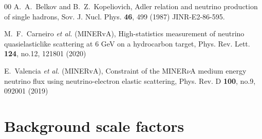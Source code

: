 \documentclass[aps,prl,twocolumn,superscriptaddress,nofootinbib]{revtex4-1}
\begin{document}
\begin{thebibliography}{00}
A.~A.~Belkov and B.~Z.~Kopeliovich,
Adler relation and neutrino production of single hadrons,
Sov. J. Nucl. Phys. \textbf{46}, 499 (1987)
JINR-E2-86-595.

M.~F.~Carneiro \textit{et al.} (MINERvA),
High-statistics measurement of neutrino quasielasticlike scattering at 6 GeV on a hydrocarbon target,
Phys. Rev. Lett. \textbf{124}, no.12, 121801 (2020)

E.~Valencia \textit{et al.} (MINERvA),
Constraint of the MINER$\nu$A medium energy neutrino flux using neutrino-electron elastic scattering,
Phys. Rev. D \textbf{100}, no.9, 092001 (2019)

\end{thebibliography}

\onecolumngrid
\pagebreak
{}

\section{Background scale factors} \label{sec1:bkgds}
\end{document}
